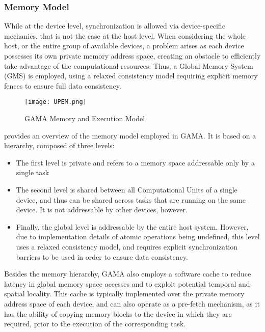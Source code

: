 \subsubsection{Memory Model}

While at the device level, synchronization is allowed via device-specific mechanics, that is not the case at the host level. When considering the whole host, or the entire group of available devices, a problem arises as each device possesses its own private memory address space, creating an obstacle to efficiently take advantage of the computational resources. Thus, a Global Memory System (GMS) is employed, using a relaxed consistency model requiring explicit memory fences to ensure full data consistency. 

\begin{figure}[!htp]
  \centering
  \texttt{[image: UPEM.png]}
  \caption{GAMA Memory and Execution Model}
  \label{fig:upem}
\end{figure}

 provides an overview of the memory model employed in GAMA. It is based on a hierarchy, composed of three levels:
\begin{itemize}
  \item The first level is private and refers to a memory space addressable only by a single task
  \item The second level is shared between all Computational Units of a single device, and thus can be shared across tasks that are running on the same device. It is not addressable by other devices, however.
  \item Finally, the global level is addressable by the entire host system. However, due to implementation details of atomic operations being undefined, this level uses a relaxed consistency model, and requires explicit synchronization barriers to be used in order to ensure data consistency. 
\end{itemize}

Besides the memory hierarchy, GAMA also employs a software cache to reduce latency in global memory space accesses and to exploit potential temporal and spatial locality. This cache is typically implemented over the private memory address space of each device, and can also operate as a pre-fetch mechanism, as it has the ability of copying memory blocks to the device in which they are required, prior to the execution of the corresponding task.
